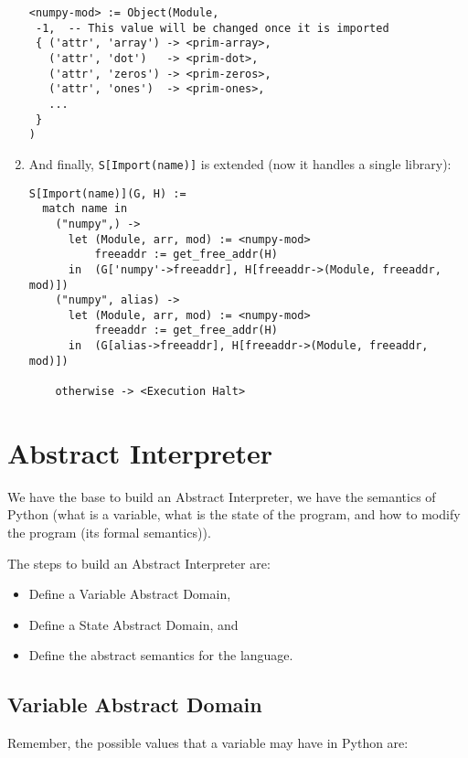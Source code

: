 \begin{enumerate}
\begin{verbatim}
<numpy-mod> := Object(Module,
 -1,  -- This value will be changed once it is imported
 { ('attr', 'array') -> <prim-array>,
   ('attr', 'dot')   -> <prim-dot>,
   ('attr', 'zeros') -> <prim-zeros>,
   ('attr', 'ones')  -> <prim-ones>,
   ...
 }
)
\end{verbatim}
\item
  And finally, \texttt{S{[}Import(name){]}} is extended (now it handles
  a single library):

\begin{verbatim}
S[Import(name)](G, H) :=
  match name in
    ("numpy",) ->
      let (Module, arr, mod) := <numpy-mod>
          freeaddr := get_free_addr(H)
      in  (G['numpy'->freeaddr], H[freeaddr->(Module, freeaddr, mod)])
    ("numpy", alias) ->
      let (Module, arr, mod) := <numpy-mod>
          freeaddr := get_free_addr(H)
      in  (G[alias->freeaddr], H[freeaddr->(Module, freeaddr, mod)])

    otherwise -> <Execution Halt>
\end{verbatim}
\end{enumerate}

\section{Abstract Interpreter}\label{abstract-interpreter}

{}

We have the base to build an Abstract Interpreter, we have the semantics
of Python (what is a variable, what is the state of the program, and how
to modify the program (its formal semantics)).

The steps to build an Abstract Interpreter are:

\begin{itemize}
\tightlist
\item
  Define a Variable Abstract Domain,
\item
  Define a State Abstract Domain, and
\item
  Define the abstract semantics for the language.
\end{itemize}

\subsection{Variable Abstract Domain}\label{variable-abstract-domain}

Remember, the possible values that a variable may have in Python are:

